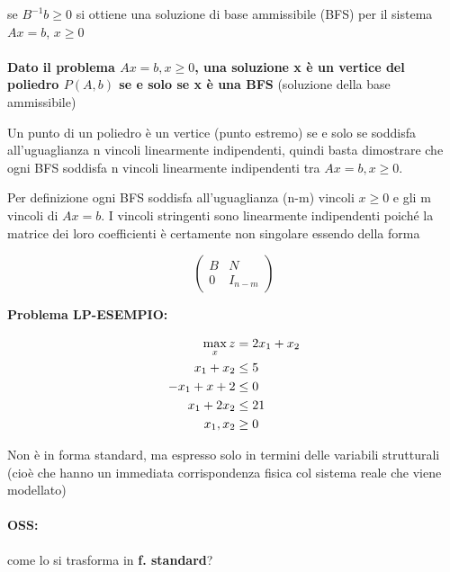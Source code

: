 \documentclass[a4paper, 11pt]{article}
\begin{document}
            se $B^{-1} b \geq 0$ si ottiene una soluzione di base ammissibile (BFS) per il sistema $Ax = b$, $x \geq 0$


            \paragraph{}
            \textbf{Dato il problema $Ax = b,x \geq 0$, una soluzione x è un vertice del
            poliedro $P(A, b)$ se e solo se x è una BFS} (soluzione della base ammissibile)

            Un punto di un poliedro è un vertice (punto estremo) se e solo se soddisfa all’uguaglianza n vincoli linearmente indipendenti, quindi basta dimostrare che ogni BFS soddisfa n vincoli linearmente indipendenti tra $Ax = b,x \geq 0$.

            Per definizione ogni BFS soddisfa all’uguaglianza (n-m) vincoli $x \geq 0$ e gli m
            vincoli di $Ax = b$. I vincoli stringenti sono linearmente indipendenti poiché la matrice dei loro coefficienti è certamente non singolare essendo della forma
            

            \[
                \begin{pmatrix}
                    B & N \\
                    0 & I_{n-m}
                \end{pmatrix}
            \]

            \textbf{Problema LP-ESEMPIO: }

            \begin{align}
                \max_{x} z &= 2x_1+x_2 \notag \\
                x_1 + x_2 &\leq 5 \notag \\
                -x_1 + x+2 &\leq 0 \notag \\
                x_1 + 2x_2 &\leq 21 \notag \\
                x_1, x_2 &\geq 0 \notag 
            \end{align}

            Non è in forma standard, ma espresso solo in termini delle variabili strutturali (cioè che hanno un immediata corrispondenza
            fisica col sistema reale che viene modellato)

            \paragraph{OSS: } come lo si trasforma in \textbf{f. standard}? 
\end{document}
